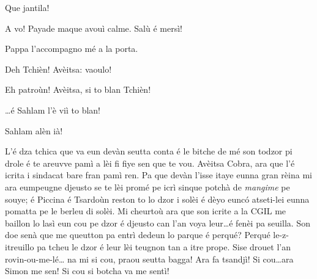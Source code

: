 \begin{drama}
\Cienspeaks Que jantila!


\Cienspeaks A vo! Payade maque avouì calme. Salù é mersì!

\Simonspeaks Pappa l’accompagno mé a la porta.


\Cienspeaks Deh Tchièn! Avèitsa: vaoulo!


\Sahlammspeaks Eh patroùn! Avèitsa, si to blan Tchièn! 

\Mariettospeaks \ldots é Sahlam l'è viì to blan! 


\Mariettospeaks Sahlam alèn ià!





\scene[-- La morale]


\Cienspeaks {} L’é dza tchica que va eun devàn seutta conta é le bitche de mé son todzor pi drole é te areuvve pamì a lèi fi fiye sen que te vou. Avèitsa Cobra, ara que l’é icrita i sindacat bare fran pamì ren. Pa que devàn l’isse itaye eunna gran rèina mi ara eumpeugne djeusto se te lèi promé pe icrì sinque potchà de \textit{mangime} pe souye; é Piccina é Tsardoùn reston to lo dzor i solèi é dèyo eunc\'o atseti-lei eunna pomatta pe le berleu di solèi. Mi cheurtoù ara que son icrite a la CGIL me baillon lo lasì eun cou pe dzor é djeusto can l’an voya leur\ldots é fenèi pa seuilla. Son doe senà que me queutton pa entrì dedeun lo parque é perqué? Perqué le-z-itreuillo pa tcheu le dzor é leur lèi teugnon tan a itre prope.  Sise drouet l’an rovin-ou-me-lé\ldots {} na mi si cou, praou seutta bagga!  Ara fa tsandjì! Si cou\ldots ara Simon me sen! Si cou si botcha va me sentì!


\end{drama}
